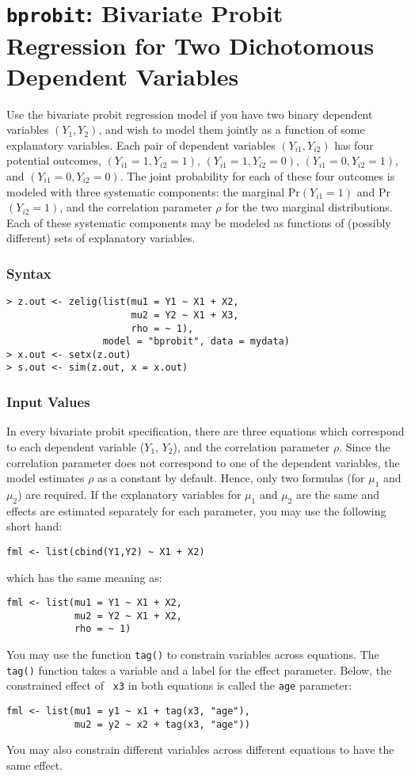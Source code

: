 \section{{\tt bprobit}: Bivariate Probit Regression for Two
Dichotomous Dependent Variables}\label{bprobit}

Use the bivariate probit regression model if you have two binary
dependent variables $(Y_1, Y_2)$, and wish to model them jointly as a
function of some explanatory variables.  Each pair of dependent
variables $(Y_{i1}, Y_{i2})$ has four potential outcomes, $(Y_{i1}=1,
Y_{i2}=1)$, $(Y_{i1}=1, Y_{i2}=0)$, $(Y_{i1}=0, Y_{i2}=1)$, and
$(Y_{i1}=0, Y_{i2}=0)$.  The joint probability for each of these four
outcomes is modeled with three systematic components: the marginal
Pr$(Y_{i1} = 1)$ and Pr$(Y_{i2} = 1)$, and the correlation parameter
$\rho$ for the two marginal distributions.  Each of these systematic
components may be modeled as functions of (possibly different) sets of
explanatory variables.

\subsubsection{Syntax}

\begin{verbatim}
> z.out <- zelig(list(mu1 = Y1 ~ X1 + X2, 
                      mu2 = Y2 ~ X1 + X3,
                      rho = ~ 1),
                 model = "bprobit", data = mydata)
> x.out <- setx(z.out)
> s.out <- sim(z.out, x = x.out)
\end{verbatim}

\subsubsection{Input Values}

In every bivariate probit specification, there are three equations
which correspond to each dependent variable ($Y_1$, $Y_2$), and the
correlation parameter $\rho$.  Since the correlation parameter does
not correspond to one of the dependent variables, the model estimates
$\rho$ as a constant by default.  Hence, only two formulas (for
$\mu_1$ and $\mu_2$) are required.  If the explanatory variables for
$\mu_1$ and $\mu_2$ are the same and effects are estimated separately
for each parameter, you may use the following short hand:  
\begin{verbatim}
fml <- list(cbind(Y1,Y2) ~ X1 + X2)
\end{verbatim}
which has the same meaning as:  
\begin{verbatim}
fml <- list(mu1 = Y1 ~ X1 + X2,  
            mu2 = Y2 ~ X1 + X2, 
            rho = ~ 1)
\end{verbatim}
You may use the function {\tt tag()} to constrain variables across
equations.  The {\tt tag()} function takes a variable and a label for
the effect parameter.  Below, the constrained effect of {\tt
x3} in both equations is called the {\tt age} parameter:  
\begin{verbatim}
fml <- list(mu1 = y1 ~ x1 + tag(x3, "age"), 
            mu2 = y2 ~ x2 + tag(x3, "age"))
\end{verbatim}
You may also constrain different variables across different equations
to have the same effect.  

